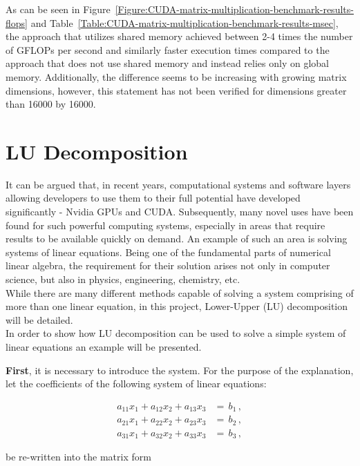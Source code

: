 As can be seen in Figure~\ref{Figure:CUDA-matrix-multiplication-benchmark-results-flops} and Table~\ref{Table:CUDA-matrix-multiplication-benchmark-results-msec}, the approach that utilizes shared memory achieved between 2-4 times the number of GFLOPs per second and similarly faster execution times compared to the approach that does not use shared memory and instead relies only on global memory. Additionally, the difference seems to be increasing with growing matrix dimensions, however, this statement has not been verified for dimensions greater than 16000 by 16000.



\section{LU Decomposition}\label{Section:theory-lu-decomposition}
It can be argued that, in recent years, computational systems and software layers allowing developers to use them to their full potential have developed significantly - Nvidia GPUs and CUDA. Subsequently, many novel uses have been found for such powerful computing systems, especially in areas that require results to be available quickly on demand. An example of such an area is solving systems of linear equations. Being one of the fundamental parts of numerical linear algebra, the requirement for their solution arises not only in computer science, but also in physics, engineering, chemistry, etc. \\
While there are many different methods capable of solving a system comprising of more than one linear equation, in this project, Lower-Upper (LU) decomposition will be detailed. \\
In order to show how LU decomposition can be used to solve a simple system of linear equations an example will be presented. 
\par \textbf{First}, it is necessary to introduce the system. For the purpose of the explanation, let the coefficients of the following system of linear equations:

\begin{align}
	a_{11}x_1 + a_{12}x_2 + a_{13}x_{3}&= \,b_1 \nonumber\,, \\ 
	a_{21}x_1 + a_{22}x_2 + a_{23}x_{3}&= \,b_2 \label{Equation:LU-decomposition-system-linear-equations}\,, \\
	a_{31}x_1 + a_{32}x_2 + a_{33}x_{3}&= \,b_3 \nonumber\,,
\end{align}

be re-written into the matrix form

